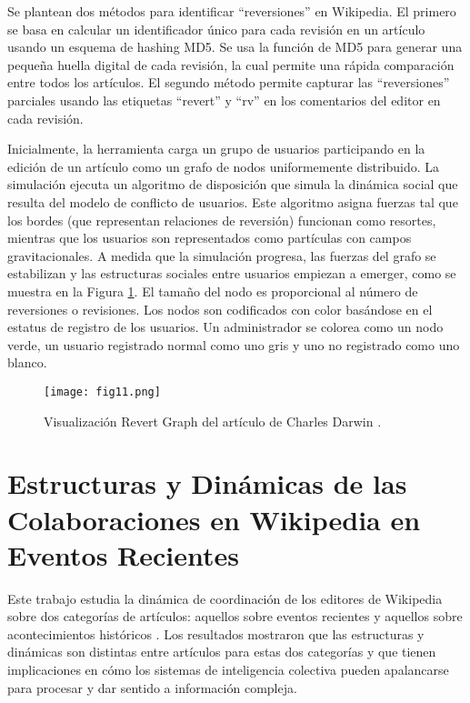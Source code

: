 Se plantean dos métodos para identificar “reversiones” en Wikipedia. El primero se basa en calcular un identificador único para cada revisión en un artículo usando un esquema de hashing MD5. Se usa la función de MD5 para generar una pequeña huella digital de cada revisión, la cual permite una rápida comparación entre todos los artículos. El segundo método permite capturar las “reversiones” parciales usando las etiquetas “revert” y “rv” en los comentarios del editor en cada revisión.

Inicialmente, la herramienta carga un grupo de usuarios participando en la edición de un artículo como un grafo de nodos uniformemente distribuido. La simulación ejecuta un algoritmo de disposición que simula la dinámica social que resulta del modelo de conflicto de usuarios. Este algoritmo asigna fuerzas tal que los bordes (que representan relaciones de reversión) funcionan como resortes, mientras que los usuarios son representados como partículas con campos gravitacionales. A medida que la simulación progresa, las fuerzas del grafo se estabilizan y las estructuras sociales entre usuarios empiezan a emerger, como se muestra en la Figura \ref{fig:fig11}. El tamaño del nodo es proporcional al número de reversiones o revisiones. Los nodos son codificados con color basándose en el estatus de registro de los usuarios. Un administrador se colorea como un nodo verde, un usuario registrado normal como uno gris y uno no registrado como uno blanco.

\begin{figure}[htp]
  \centering
  \texttt{[image: fig11.png]}
  \caption[Visualización Revert Graph del artículo de Charles Darwin]{Visualización Revert Graph del artículo de Charles Darwin \cite[Fig. 1]{Suh07}.}
  \label{fig:fig11}
\end{figure}

\section{Estructuras y Dinámicas de las Colaboraciones en Wikipedia en Eventos Recientes}
Este trabajo estudia la dinámica de coordinación de los editores de Wikipedia sobre dos categorías de artículos: aquellos sobre eventos recientes y aquellos sobre acontecimientos históricos \cite{Kee12}. Los resultados mostraron que las estructuras y dinámicas son distintas entre artículos para estas dos categorías y que tienen implicaciones en cómo los sistemas de inteligencia colectiva pueden apalancarse para procesar y dar sentido a información compleja.


